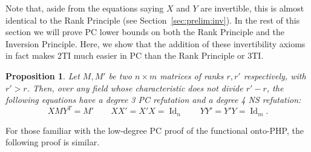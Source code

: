 \documentclass[10pt,a4paper]{article}
\newtheorem{proposition}[theorem]{Proposition}
\theoremstyle{definition}
\DeclareMathOperator{\Id}{Id}
\begin{document}
Note that, aside from the equations saying $X$ and $Y$ are invertible, this is almost identical to the Rank Principle (see Section~\ref{sec:prelim:inv}). In the rest of this section we will prove PC lower bounds on both the Rank Principle and the Inversion Principle. Here, we show that the addition of these invertibility axioms in fact makes 2TI much easier in PC than the Rank Principle or 3TI.

\begin{proposition}
Let $M,M'$ be two $n \times m$ matrices of  ranks $r,r'$ respectively, with $r' > r$. Then, over any field whose characteristic does not divide $r'-r$, the following equations have a degree 3 PC refutation and a degree 4 NS refutation:
\[
XMY^T = M' \qquad XX' = X' X = \Id_n \qquad YY' = Y' Y = \Id_m.
\]
\end{proposition}

For those familiar with the low-degree PC proof of the functional onto-PHP, the following proof is similar. 
\newcommand{\Tr}{\text{Tr}}
\end{document}
